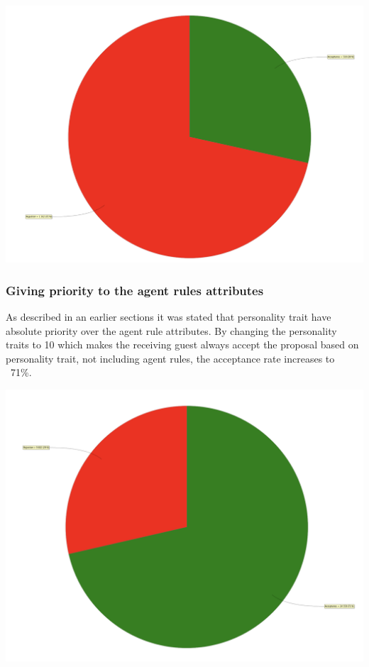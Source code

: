 \documentclass[a4paper,10pt]{article}
\begin{document}
\begin{center}{}
\centering\includegraphics[scale=0.05]{notimelimit.png}\par
\end{center}

\clearpage
\subsubsection{Giving priority to the agent rules attributes}
As described in an earlier sections it was stated that personality trait have absolute priority over the agent rule attributes. By changing the personality traits to 10 which makes the receiving guest always accept the proposal based on personality trait, not including agent rules, the acceptance rate increases to ~71\%.

\begin{center}{}
\centering\includegraphics[scale=0.05]{priority.png}\par
\end{center}
\end{document}
